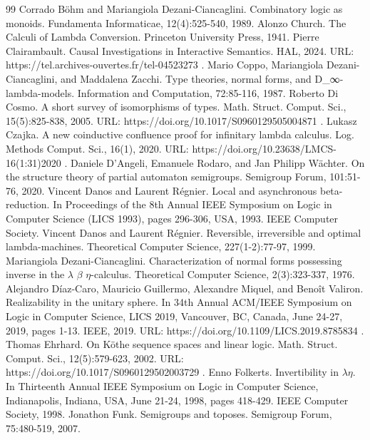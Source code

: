 \documentclass[10pt,a4paper]{amsart}
\begin{document}
\begin{thebibliography}{99}
 Corrado Böhm and Mariangiola Dezani-Ciancaglini. Combinatory logic as monoids. Fundamenta Informaticae, 12(4):525-540, 1989.
 Alonzo Church. The Calculi of Lambda Conversion. Princeton University Press, 1941.
 Pierre Clairambault. Causal Investigations in Interactive Semantics. HAL, 2024. URL: https://tel.archives-ouvertes.fr/tel-04523273 .
 Mario Coppo, Mariangiola Dezani-Ciancaglini, and Maddalena Zacchi. Type theories, normal forms, and D\_∞-lambda-models. Information and Computation, 72:85-116, 1987.
 Roberto Di Cosmo. A short survey of isomorphisms of types. Math. Struct. Comput. Sci., 15(5):825-838, 2005. URL: https://doi.org/10.1017/S0960129505004871 .
 Lukasz Czajka. A new coinductive confluence proof for infinitary lambda calculus. Log. Methods Comput. Sci., 16(1), 2020. URL: https://doi.org/10.23638/LMCS-16(1:31)2020 .
 Daniele D'Angeli, Emanuele Rodaro, and Jan Philipp Wächter. On the structure theory of partial automaton semigroups. Semigroup Forum, 101:51-76, 2020.
 Vincent Danos and Laurent Régnier. Local and asynchronous beta-reduction. In Proceedings of the 8th Annual IEEE Symposium on Logic in Computer Science (LICS 1993), pages 296-306, USA, 1993. IEEE Computer Society.
 Vincent Danos and Laurent Régnier. Reversible, irreversible and optimal lambda-machines. Theoretical Computer Science, 227(1-2):77-97, 1999.
 Mariangiola Dezani-Ciancaglini. Characterization of normal forms possessing inverse in the \ensuremath{\lambda} \ensuremath{\beta} \ensuremath{\eta}-calculus. Theoretical Computer Science, 2(3):323-337, 1976.
 Alejandro Díaz-Caro, Mauricio Guillermo, Alexandre Miquel, and Benoît Valiron. Realizability in the unitary sphere. In 34th Annual ACM/IEEE Symposium on Logic in Computer Science, LICS 2019, Vancouver, BC, Canada, June 24-27, 2019, pages 1-13. IEEE, 2019. URL: https://doi.org/10.1109/LICS.2019.8785834 .
 Thomas Ehrhard. On Köthe sequence spaces and linear logic. Math. Struct. Comput. Sci., 12(5):579-623, 2002. URL: https://doi.org/10.1017/S0960129502003729 .
 Enno Folkerts. Invertibility in \ensuremath{\lambda}\ensuremath{\eta}. In Thirteenth Annual IEEE Symposium on Logic in Computer Science, Indianapolis, Indiana, USA, June 21-24, 1998, pages 418-429. IEEE Computer Society, 1998.
 Jonathon Funk. Semigroups and toposes. Semigroup Forum, 75:480-519, 2007.

\end{thebibliography}
\end{document}
